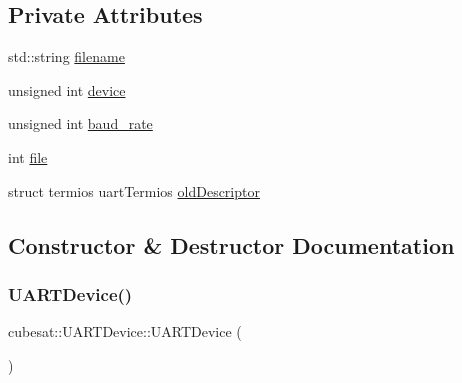 \subsection*{Private Attributes}
\begin{DoxyCompactItemize}
\item 
std\+::string \hyperlink{classcubesat_1_1UARTDevice_a26f9e39eb44dd57e6adbf934bf65dfb4}{filename}
\item 
unsigned int \hyperlink{classcubesat_1_1UARTDevice_a19a4104e3e06e3d76a4ea7c2c3ee26ad}{device}
\item 
unsigned int \hyperlink{classcubesat_1_1UARTDevice_ab5c12926f749e9bbcae638cd973f8d6f}{baud\+\_\+rate}
\item 
int \hyperlink{classcubesat_1_1UARTDevice_a40269dd62c40a4967159e1f6f0be56b8}{file}
\item 
struct termios uart\+Termios \hyperlink{classcubesat_1_1UARTDevice_a3d85748f0c38b743ff4e6e139635c1cf}{old\+Descriptor}
\end{DoxyCompactItemize}


\subsection{Constructor \& Destructor Documentation}
\mbox{\label{classcubesat_1_1UARTDevice_af648c63f795f89afac21d89352200a35}} 
\subsubsection{\texorpdfstring{U\+A\+R\+T\+Device()}{UARTDevice()}\hspace{0.1cm}{\footnotesize\ttfamily [1/2]}}
{\footnotesize\ttfamily cubesat\+::\+U\+A\+R\+T\+Device\+::\+U\+A\+R\+T\+Device (\begin{DoxyParamCaption}{ }\end{DoxyParamCaption})\hspace{0.3cm}{\ttfamily [inline]}}

\mbox{\label{classcubesat_1_1UARTDevice_afe892b54ee594ad24c4d89239717deab}} 
